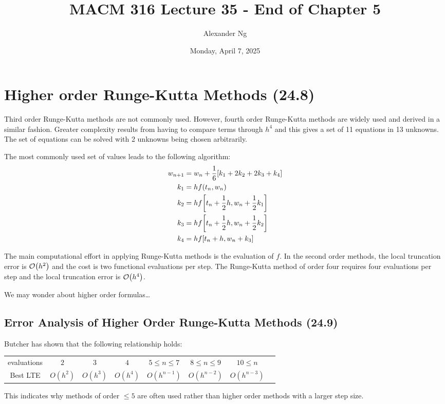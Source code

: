 \documentclass[12pt]{article}
\begin{document}
\title{MACM 316 Lecture 35 - End of Chapter 5}
\author{Alexander Ng}
\date{Monday, April 7, 2025}

\maketitle

\section{Higher order Runge-Kutta Methods (24.8)}
Third order Runge-Kutta methods are not commonly used. However, fourth order
Runge-Kutta methods are widely used and derived in a similar fashion. Greater
complexity results from having to compare terms through $h^4$ and this gives a
set of 11 equations in 13 unknowns. The set of equations can be solved with 2
unknowns being chosen arbitrarily. 

The most commonly used set of values leads to the following algorithm:
\begin{align*}
  w_{n+1} &= w_n+\frac{1}{6}\bqty{k_1+2k_2+2k_3+k_4} \\
  k_1 &= hf(t_n, w_n) \\
  k_2 &= hf\bqty{t_n+\frac{1}{2}h, w_n + \frac{1}{2}k_1} \\
  k_3 &= hf\bqty{t_n+\frac{1}{2}h, w_n + \frac{1}{2}k_2} \\
  k_4 &= hf\bqty{t_n+h, w_n + k_3}
\end{align*}

The main computational effort in applying Runge-Kutta methods is the evaluation
of $f$. In the second order methods, the local truncation error is $\order{h^2}$
and the cost is two functional evaluations per step. The Runge-Kutta method of
order four requires four evaluations per step and the local truncation error is
$\order{h^4}$.

We may wonder about higher order formulas\dots

\subsection{Error Analysis of Higher Order Runge-Kutta Methods (24.9)}
Butcher has shown that the following relationship holds:

\begin{tabular}{c|ccccccc}
  evaluations & $2$ & $3$ & $4$ & $5\leq n\leq7$ & $8\leq n\leq9$ & $10\leq n$\\
  Best LTE & $O(h^2)$ & $O(h^3)$ & $O(h^4)$ & $O(h^{n-1})$ &
  $O(h^{n-2})$ &$O(h^{n-3})$
\end{tabular}

This indicates why methods of order $\leq 5$ are often used rather than higher
order methods with a larger step size.
\end{document}
